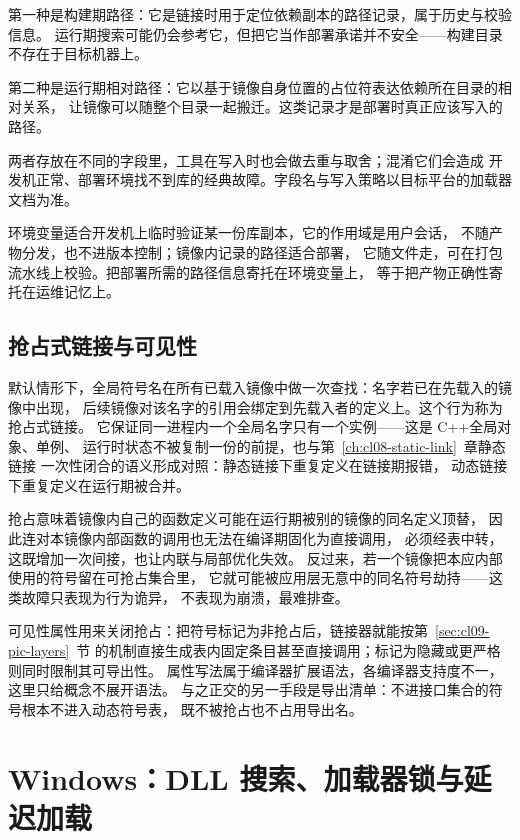 \documentclass[12pt,a4paper,fontset=fandol]{ctexbook}
\newcommand{\cpp}[1]{C++#1}
\newcommand{\Win}{\textsf{Windows}}
\begin{document}
第一种是构建期路径：它是链接时用于定位依赖副本的路径记录，属于历史与校验信息。
运行期搜索可能仍会参考它，但把它当作部署承诺并不安全——构建目录不存在于目标机器上。

第二种是运行期相对路径：它以基于镜像自身位置的占位符表达依赖所在目录的相对关系，
让镜像可以随整个目录一起搬迁。这类记录才是部署时真正应该写入的路径。

两者存放在不同的字段里，工具在写入时也会做去重与取舍；混淆它们会造成
开发机正常、部署环境找不到库的经典故障。字段名与写入策略以目标平台的加载器文档为准。

\begin{compare}[title={环境变量与镜像内记录}]
  环境变量适合开发机上临时验证某一份库副本，它的作用域是用户会话，
  不随产物分发，也不进版本控制；镜像内记录的路径适合部署，
  它随文件走，可在打包流水线上校验。把部署所需的路径信息寄托在环境变量上，
  等于把产物正确性寄托在运维记忆上。
\end{compare}

\subsection{抢占式链接与可见性}

默认情形下，全局符号名在所有已载入镜像中做一次查找：名字若已在先载入的镜像中出现，
后续镜像对该名字的引用会绑定到先载入者的定义上。这个行为称为抢占式链接。
它保证同一进程内一个全局名字只有一个实例——这是 \cpp 全局对象、单例、
运行时状态不被复制一份的前提，也与第~\ref{ch:cl08-static-link}~章静态链接
一次性闭合的语义形成对照：静态链接下重复定义在链接期报错，
动态链接下重复定义在运行期被合并。

\begin{warning}[title={抢占是有代价的}]
  抢占意味着镜像内自己的函数定义可能在运行期被别的镜像的同名定义顶替，
  因此连对本镜像内部函数的调用也无法在编译期固化为直接调用，
  必须经表中转，这既增加一次间接，也让内联与局部优化失效。
  反过来，若一个镜像把本应内部使用的符号留在可抢占集合里，
  它就可能被应用层无意中的同名符号劫持——这类故障只表现为行为诡异，
  不表现为崩溃，最难排查。
\end{warning}

可见性属性用来关闭抢占：把符号标记为非抢占后，链接器就能按第~\ref{sec:cl09-pic-layers}~节
的机制直接生成表内固定条目甚至直接调用；标记为隐藏或更严格则同时限制其可导出性。
属性写法属于编译器扩展语法，各编译器支持度不一，这里只给概念不展开语法。
与之正交的另一手段是导出清单：不进接口集合的符号根本不进入动态符号表，
既不被抢占也不占用导出名。

\section{\Win：DLL 搜索、加载器锁与延迟加载}\label{sec:cl09-windows}
\end{document}
